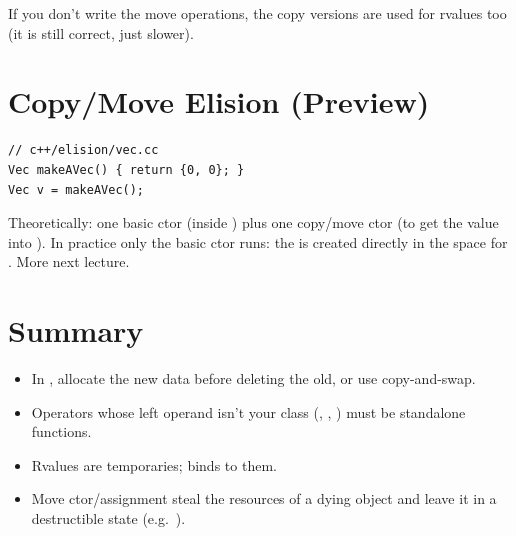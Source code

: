 If you don't write the move operations, the copy versions are used for rvalues
too (it is still correct, just slower).

\section{Copy/Move Elision (Preview)}
\begin{lstlisting}[style=cpp]
// c++/elision/vec.cc
Vec makeAVec() { return {0, 0}; }
Vec v = makeAVec();
\end{lstlisting}
Theoretically: one basic ctor (inside ) plus one copy/move ctor
(to get the value into ). In practice only the basic ctor runs: the
 is created directly in the space for . More next
lecture.

\section*{Summary}
\begin{itemize}
  \item In , allocate the new data before deleting the old, or
        use copy-and-swap.
  \item Operators whose left operand isn't your class (,
        \code{<<}, \code{>>}) must be standalone functions.
  \item Rvalues are temporaries;  binds to them.
  \item Move ctor/assignment steal the resources of a dying object and leave it
        in a destructible state (e.g.\ ).
\end{itemize}
